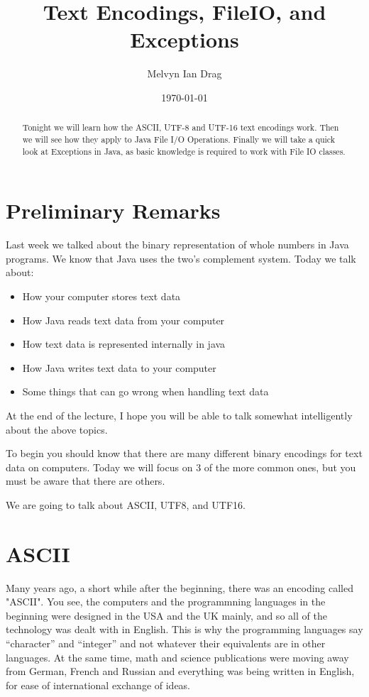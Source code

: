 \documentclass[12pt]{article}
\title{\Large Text Encodings, FileIO, and Exceptions }
\author{
	Melvyn Ian Drag
}
\date{\today}
\begin{document}
\maketitle

\begin{abstract}
Tonight we will learn how the ASCII, UTF-8 and UTF-16 text encodings work. Then we will see how they apply to Java File I/O Operations. Finally we will take a quick look at Exceptions in Java, as basic knowledge is required to work with File IO classes.
\end{abstract}

\section{Preliminary Remarks}
Last week we talked about the binary representation of whole numbers in Java
programs. We know that Java uses the two's complement system. Today we talk
about:
\begin{itemize}
\item How your computer stores text data
\item How Java reads text data from your computer
\item How text data is represented internally in java
\item How Java writes text data to your computer
\item Some things that can go wrong when handling text data
\end{itemize}

At the end of the lecture, I hope you will be able to talk somewhat
intelligently about the above topics.

To begin you should know that there are many different binary encodings for text
data on computers. Today we will focus on 3 of the more common ones, but you
must be aware that there are others.

We are going to talk about ASCII, UTF8, and UTF16.

\section{ASCII}
Many years ago, a short while after the beginning, there was an encoding called "ASCII". You see, the computers and the programmning languages in the beginning were designed in the USA and the UK mainly, and so all of the technology was dealt with in English. This is why the programming languages say ``character'' and ``integer'' and not whatever their equivalents are in other languages. At the same time, math and science publications were moving away from German, French and Russian and everything was being written in English, for ease of international exchange of ideas. 
\end{document}
